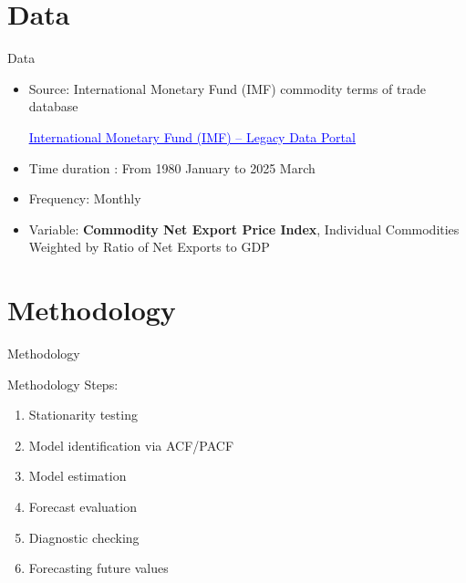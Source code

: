 \documentclass[11pt]{beamer}
\begin{document}
	\section{Data}
	\begin{frame}{Data}
		\begin{itemize}
			\item Source: International Monetary Fund (IMF)
			commodity terms of trade database
		
				
				\href{https://legacydata.imf.org/?sk=466fa59d-0ae3-40c9-b2a9-ac719d3a734e&hide_uv=1}{\textcolor{blue}{\underline{International Monetary Fund (IMF) – Legacy Data Portal}}}
			
			\vspace{0.5cm}
			\item Time duration : From 1980 January to 2025 March
			\vspace{0.5cm}
			\item Frequency: Monthly
			\vspace{0.5cm}
	
			\item Variable:  \textbf{Commodity Net Export Price Index}, Individual Commodities Weighted by
			Ratio of Net Exports to GDP
		\end{itemize}
		
	\end{frame}
	
    
	\section{Methodology}
	\begin{frame}{Methodology}
		
			Methodology Steps:
			\begin{enumerate}
			\item  Stationarity testing 
			\item  Model identification via ACF/PACF
			\item  Model estimation 
			\item Forecast evaluation 
			\item Diagnostic checking
			\item Forecasting future values
		\end{enumerate}
		
		
	\end{frame}
	
\end{document}
